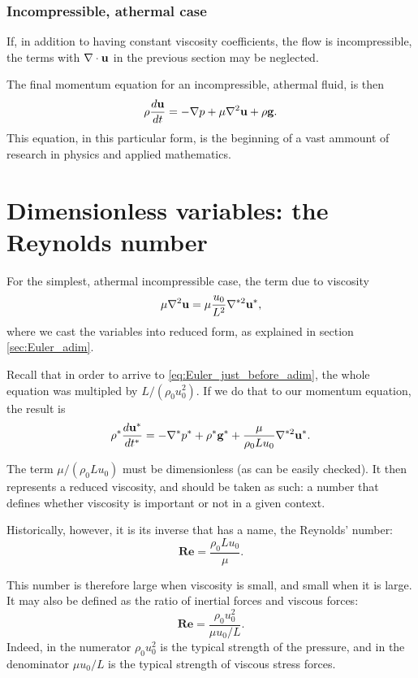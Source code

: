 \subsubsection{Incompressible, athermal case}

If, in addition to having constant viscosity coefficients, the flow is
incompressible, the terms with $\nabla\cdot\mathbf{u}$ in the previous section may be
neglected.

The final momentum equation for an incompressible, athermal fluid, is
then
\begin{equation}
  \label{eq:NS_usual}
  \rho \frac{d\mathbf{u} }{dt} =
  - \nabla p 
  + \mu \nabla^2 \mathbf{u}
  + \rho \mathbf{g} .
\end{equation}
This equation, in this particular form, is the beginning of a vast
ammount of research in physics and applied mathematics.





\section{Dimensionless variables: the Reynolds number}

For the simplest, athermal incompressible case, the term due to
viscosity
\[
\mu \nabla^2 \mathbf{u} = \mu \frac{u_0}{L^2} \nabla^{*2} \mathbf{u}^* ,
\]
where we cast the variables into reduced form, as explained in
section \ref{sec:Euler_adim}.

Recall that in order to arrive to \ref{eq:Euler_just_before_adim}, the
whole equation was multipled by $L/(\rho_0 u_0^2)$. If we do that to our
momentum equation, the result is
\[
\rho^* \frac{d\mathbf{u}^* }{dt^* } =
-  \nabla^* p^*
+  \rho^* \mathbf{g}^* +
\frac{\mu }{\rho_ 0 L u_0 } \nabla^{*2} \mathbf{u}^* .
\]

The term $\mu /( \rho_ 0 L u_0)$ must be dimensionless (as can be
easily checked). It then represents a reduced viscosity, and should be
taken as such: a number that defines whether viscosity is important or
not in a given context.

Historically, however, it is its inverse that has a name, the
Reynolds' number:
\begin{equation}
  \mathbf{Re}= \frac{\rho_ 0 L u_0 }{\mu }.
\end{equation}

This number is therefore large when viscosity is small, and small when
it is large. It may also be defined as the ratio of inertial forces and
viscous forces:
\begin{equation}
  \mathbf{Re}= \frac{\rho_ 0 u^2_0 }{\mu u_0 / L }.
\end{equation}
Indeed, in the numerator $\rho_ 0 u^2_0$ is the typical strength of the
pressure, and in the denominator $\mu u_0 / L $ is the typical
strength of viscous stress forces.

